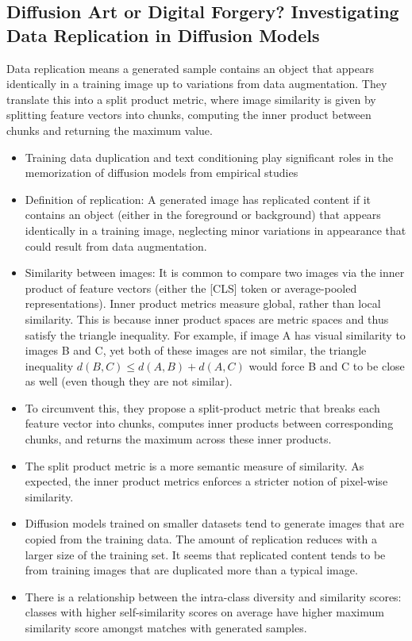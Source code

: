 \documentclass{article}
\begin{document}
\subsection{Diffusion Art or Digital Forgery? Investigating Data Replication in Diffusion Models}
\begin{tldr}
    Data replication means a generated sample contains an object that appears identically in a training image up to variations from data augmentation. They translate this into a split product metric, where image similarity is given by splitting feature vectors into chunks, computing the inner product between chunks and returning the maximum value.
\end{tldr}
\begin{itemize}
    \item Training data duplication and text conditioning play significant roles in the memorization of diffusion models from empirical studies
    \item Definition of replication: A generated image has replicated content if it contains an object (either in the foreground or background) that appears identically in a training image, neglecting minor variations in appearance that could result from data augmentation.
    \item Similarity between images: It is common to compare two images via the inner product of feature vectors (either the [CLS] token or average-pooled representations). Inner product metrics measure global, rather than local similarity. This is because inner product spaces are metric spaces and thus satisfy the triangle inequality. For example, if image A has visual similarity to images B and C, yet both of these images are not similar, the triangle inequality $d(B,C)\leq d(A,B) + d(A,C)$ would force B and C to be close as well (even though they are not similar).
    \item To circumvent this, they propose a split-product metric that breaks each feature vector into chunks, computes inner products between corresponding chunks, and returns the maximum across these inner products.
    \item The split product metric is a more semantic measure of similarity. As expected, the inner product metrics enforces a stricter notion of pixel-wise similarity.
    \item Diffusion models trained on smaller datasets tend to generate images that are copied from the training data. The amount of replication reduces with a larger size of the training set. It seems that replicated content tends to be from training images that are duplicated more than a typical image.
    \item There is a relationship between the intra-class diversity and similarity scores: classes with higher self-similarity scores on average have higher maximum similarity score amongst matches with generated samples.
\end{itemize}
\end{document}
